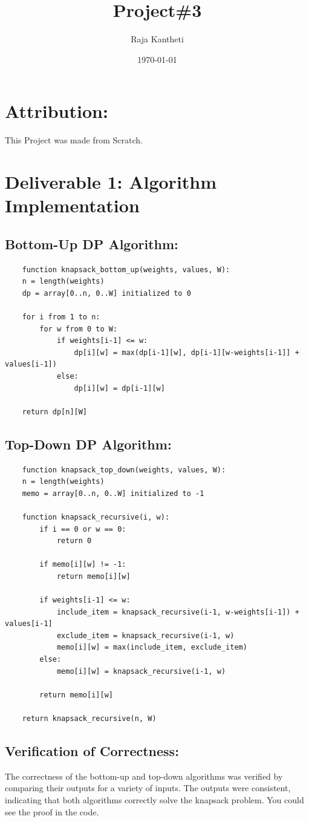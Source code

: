 \documentclass{article}
\title{Project\#3}
\author{Raja Kantheti}
\date{\today}
\begin{document}
\maketitle

\section{Attribution: }
This Project was made from Scratch. 
\section{Deliverable 1: Algorithm Implementation}
\subsection{Bottom-Up DP Algorithm: }
\begin{verbatim}
    function knapsack_bottom_up(weights, values, W):
    n = length(weights)
    dp = array[0..n, 0..W] initialized to 0

    for i from 1 to n:
        for w from 0 to W:
            if weights[i-1] <= w:
                dp[i][w] = max(dp[i-1][w], dp[i-1][w-weights[i-1]] + values[i-1])
            else:
                dp[i][w] = dp[i-1][w]

    return dp[n][W]
\end{verbatim}
\subsection{Top-Down DP Algorithm: }
\begin{verbatim}
    function knapsack_top_down(weights, values, W):
    n = length(weights)
    memo = array[0..n, 0..W] initialized to -1

    function knapsack_recursive(i, w):
        if i == 0 or w == 0:
            return 0

        if memo[i][w] != -1:
            return memo[i][w]

        if weights[i-1] <= w:
            include_item = knapsack_recursive(i-1, w-weights[i-1]) + values[i-1]
            exclude_item = knapsack_recursive(i-1, w)
            memo[i][w] = max(include_item, exclude_item)
        else:
            memo[i][w] = knapsack_recursive(i-1, w)

        return memo[i][w]

    return knapsack_recursive(n, W)
\end{verbatim}

\subsection{Verification of Correctness: }
The correctness of the bottom-up and top-down algorithms was verified by comparing their outputs for a variety of inputs. The outputs were consistent, indicating that both algorithms correctly solve the knapsack problem. You could see the proof in the code.
\end{document}
